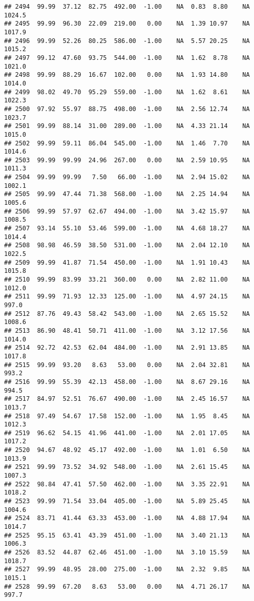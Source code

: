 \documentclass{article}\usepackage{graphicx, color}
\makeatletter
\newenvironment{kframe}{%
 \def\at@end@of@kframe{}%
 \ifinner\ifhmode%
  \def\at@end@of@kframe{\end{minipage}}%
  \begin{minipage}{\columnwidth}%
 \fi\fi%
 \def\FrameCommand##1{\hskip\@totalleftmargin \hskip-\fboxsep
 \colorbox{shadecolor}{##1}\hskip-\fboxsep
     \hskip-\linewidth \hskip-\@totalleftmargin \hskip\columnwidth}%
 \MakeFramed {\advance\hsize-\width
   \@totalleftmargin\z@ \linewidth\hsize
   \@setminipage}}%
 {\par\unskip\endMakeFramed%
 \at@end@of@kframe}
\newenvironment{knitrout}{}{} %
\makeatother
\begin{document}
\begin{knitrout}
\begin{kframe}
\begin{verbatim}
## 2494  99.99  37.12  82.75  492.00  -1.00    NA  0.83  8.80    NA 1024.5
## 2495  99.99  96.30  22.09  219.00   0.00    NA  1.39 10.97    NA 1017.9
## 2496  99.99  52.26  80.25  586.00  -1.00    NA  5.57 20.25    NA 1015.2
## 2497  99.12  47.60  93.75  544.00  -1.00    NA  1.62  8.78    NA 1021.0
## 2498  99.99  88.29  16.67  102.00   0.00    NA  1.93 14.80    NA 1014.0
## 2499  98.02  49.70  95.29  559.00  -1.00    NA  1.62  8.61    NA 1022.3
## 2500  97.92  55.97  88.75  498.00  -1.00    NA  2.56 12.74    NA 1023.7
## 2501  99.99  88.14  31.00  289.00  -1.00    NA  4.33 21.14    NA 1015.0
## 2502  99.99  59.11  86.04  545.00  -1.00    NA  1.46  7.70    NA 1014.6
## 2503  99.99  99.99  24.96  267.00   0.00    NA  2.59 10.95    NA 1011.3
## 2504  99.99  99.99   7.50   66.00  -1.00    NA  2.94 15.02    NA 1002.1
## 2505  99.99  47.44  71.38  568.00  -1.00    NA  2.25 14.94    NA 1005.6
## 2506  99.99  57.97  62.67  494.00  -1.00    NA  3.42 15.97    NA 1008.5
## 2507  93.14  55.10  53.46  599.00  -1.00    NA  4.68 18.27    NA 1014.4
## 2508  98.98  46.59  38.50  531.00  -1.00    NA  2.04 12.10    NA 1022.5
## 2509  99.99  41.87  71.54  450.00  -1.00    NA  1.91 10.43    NA 1015.8
## 2510  99.99  83.99  33.21  360.00   0.00    NA  2.82 11.00    NA 1012.0
## 2511  99.99  71.93  12.33  125.00  -1.00    NA  4.97 24.15    NA  997.0
## 2512  87.76  49.43  58.42  543.00  -1.00    NA  2.65 15.52    NA 1008.6
## 2513  86.90  48.41  50.71  411.00  -1.00    NA  3.12 17.56    NA 1014.0
## 2514  92.72  42.53  62.04  484.00  -1.00    NA  2.91 13.85    NA 1017.8
## 2515  99.99  93.20   8.63   53.00   0.00    NA  2.04 32.81    NA  993.2
## 2516  99.99  55.39  42.13  458.00  -1.00    NA  8.67 29.16    NA  994.5
## 2517  84.97  52.51  76.67  490.00  -1.00    NA  2.45 16.57    NA 1013.7
## 2518  97.49  54.67  17.58  152.00  -1.00    NA  1.95  8.45    NA 1012.3
## 2519  96.62  54.15  41.96  441.00  -1.00    NA  2.01 17.05    NA 1017.2
## 2520  94.67  48.92  45.17  492.00  -1.00    NA  1.01  6.50    NA 1013.9
## 2521  99.99  73.52  34.92  548.00  -1.00    NA  2.61 15.45    NA 1007.3
## 2522  98.84  47.41  57.50  462.00  -1.00    NA  3.35 22.91    NA 1018.2
## 2523  99.99  71.54  33.04  405.00  -1.00    NA  5.89 25.45    NA 1004.6
## 2524  83.71  41.44  63.33  453.00  -1.00    NA  4.88 17.94    NA 1014.7
## 2525  95.15  63.41  43.39  451.00  -1.00    NA  3.40 21.13    NA 1006.3
## 2526  83.52  44.87  62.46  451.00  -1.00    NA  3.10 15.59    NA 1018.7
## 2527  99.99  48.95  28.00  275.00  -1.00    NA  2.32  9.85    NA 1015.1
## 2528  99.99  67.20   8.63   53.00   0.00    NA  4.71 26.17    NA  997.7

\end{verbatim}
\end{kframe}
\end{knitrout}
\end{document}

